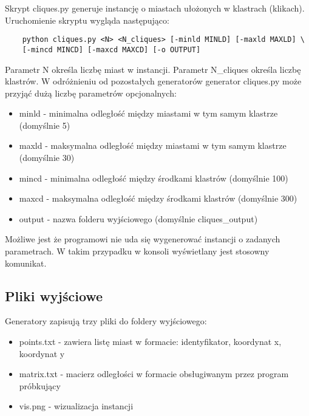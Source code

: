 Skrypt cliques.py generuje instancję o miastach ułożonych w klastrach (klikach).
Uruchomienie skryptu wygląda następująco:
\begin{lstlisting}
    python cliques.py <N> <N_cliques> [-minld MINLD] [-maxld MAXLD] \ 
    [-mincd MINCD] [-maxcd MAXCD] [-o OUTPUT]
\end{lstlisting}
Parametr N określa liczbę miast w instancji. Parametr N\_cliques określa liczbę klastrów.
W odróżnieniu od pozostałych generatorów generator cliques.py może przyjąć dużą liczbę parametrów opcjonalnych:
\begin{itemize}
    \item minld - minimalna odległość między miastami w tym samym klastrze (domyślnie 5)
    \item maxld - maksymalna odległość między miastami w tym samym klastrze (domyślnie 30)
    \item mincd - minimalna odległość między środkami klastrów (domyślnie 100)
    \item maxcd - maksymalna odległość między środkami klastrów (domyślnie 300)
    \item output - nazwa folderu wyjściowego (domyślnie cliques\_output)
\end{itemize}

Możliwe jest że programowi nie uda się wygenerować instancji o zadanych parametrach. W takim przypadku w konsoli wyświetlany jest stosowny komunikat.

\subsection{Pliki wyjściowe}
Generatory zapisują trzy pliki do foldery wyjściowego:
\begin{itemize}
    \item points.txt - zawiera listę miast w formacie: identyfikator, koordynat x, koordynat y
    \item matrix.txt - macierz odległości w formacie obsługiwanym przez program próbkujący
    \item vis.png - wizualizacja instancji
\end{itemize}

